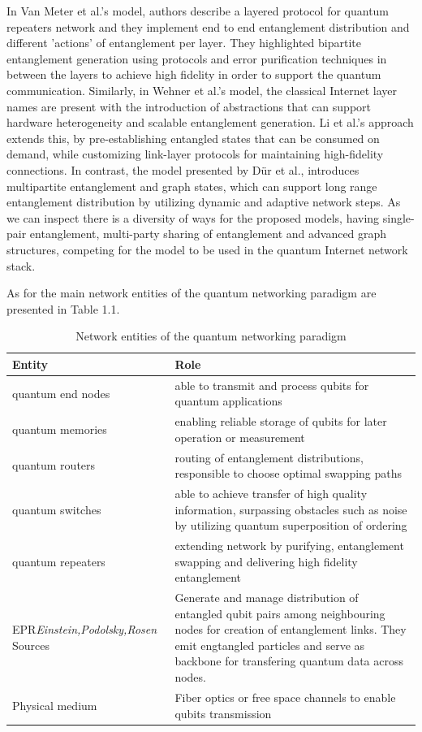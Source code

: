 \documentclass[12pt]{ieeetj}
\begin{document}
		In Van Meter et al.'s model, authors describe a layered protocol for quantum repeaters network and
		they implement end to end entanglement distribution and different 'actions' of entanglement per layer.
		They highlighted bipartite entanglement generation using protocols and error purification techniques in between the
		layers to achieve  high fidelity in order to support the quantum communication.
		Similarly, in Wehner et al.'s model, the classical Internet layer names are present with the introduction
		of abstractions that can support hardware heterogeneity and scalable entanglement generation. 
		Li et al.'s approach extends this, by pre-establishing entangled states that can be consumed on demand, 
		while customizing link-layer protocols for maintaining high-fidelity connections. 
		In contrast, the model presented by Dür et al., introduces multipartite entanglement and graph states, 
		which can support long range entanglement distribution by utilizing dynamic and adaptive network steps. 
		As we can inspect there is a diversity of ways for the proposed models, having single-pair entanglement, 
		multi-party sharing of entanglement and advanced graph structures, competing for the model to be used
		in the quantum Internet network stack.

		As for the main network entities of the quantum networking paradigm\cite{e-qnet} are presented in Table 1.1.



		\begin{table}[h!]
		\centering
		\renewcommand{\arraystretch}{0.6}
			\begin{tabular}{|p{4.5cm}|p{8cm}|}
			\hline
			\textbf{Entity} & \textbf{Role} \\ \hline
			quantum end nodes	&  able to transmit and process qubits for quantum applications		\\ \hline
			quantum memories	&  enabling reliable storage of qubits for later operation or measurement 		\\ \hline
			quantum routers		&  routing of entanglement distributions, responsible to choose optimal swapping paths 		\\ \hline
			quantum switches	&  able to achieve transfer of high quality information, surpassing obstacles such as noise by utilizing quantum
				superposition of ordering \\ \hline
			quantum repeaters	& extending network by purifying, entanglement swapping and delivering high fidelity entanglement 		\\ \hline
				EPR\textit{Einstein,Podolsky,Rosen} Sources		&  Generate and manage distribution of entangled qubit pairs among neighbouring nodes for creation of entanglement links. They emit engtangled particles and serve as backbone for transfering quantum data across nodes.		\\ \hline
			Physical medium		&  Fiber optics or free space channels to enable qubits transmission		\\ \hline
		\end{tabular}
		\caption{Network entities of the quantum networking paradigm}
		\label{tab:example}
		\end{table}
		
\end{document}
